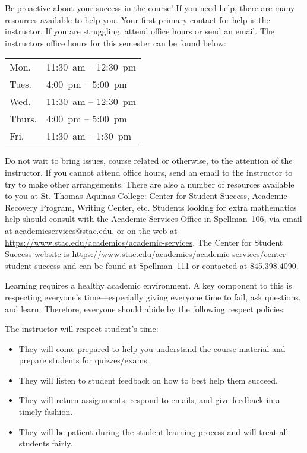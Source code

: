 \documentclass[11pt,letterpaper]{article}
\begin{document}
Be proactive about your success in the course! If you need help, there are many resources available to help you. Your first primary contact for help is the instructor. If you are struggling, attend office hours or send an email. The instructors office hours for this semester can be found below: \par
	\begin{table}[!ht]
	\centering
	\begin{tabular}{l || l}
	Mon. & 11:30~am -- 12:30~pm \\
	Tues. & 4:00~pm -- 5:00~pm \\
	Wed. & 11:30~am -- 12:30~pm \\
	Thurs. & 4:00~pm -- 5:00~pm \\
	Fri. & 11:30~am -- 1:30~pm
	\end{tabular}
	\end{table}
Do not wait to bring issues, course related or otherwise, to the attention of the instructor. If you cannot attend office hours, send an email to the instructor to try to make other arrangements. There are also a number of resources available to you at St. Thomas Aquinas College: Center for Student Success, Academic Recovery Program, Writing Center, etc. Students looking for extra mathematics help should consult with the Academic Services Office in Spellman~106, via email at \href{mailto:AcademicServices@stac.edu}{academicservices@stac.edu}, or on the web at \href{https://www.stac.edu/academics/academic-services}{https://www.stac.edu/academics/academic-services}. The Center for Student Success website is \url{https://www.stac.edu/academics/academic-services/center-student-success} and can be found at Spellman~111 or contacted at 845.398.4090. \sectionbreak





\newpage





Learning requires a healthy academic environment. A key component to this is respecting everyone's time---especially giving everyone time to fail, ask questions, and learn. Therefore, everyone should abide by the following respect policies: 

The instructor will respect student's time:
	\begin{itemize}
	\item They will come prepared to help you understand the course material and prepare students for quizzes/exams. 
	\item They will listen to student feedback on how to best help them succeed. 
	\item They will return assignments, respond to emails, and give feedback in a timely fashion. 
	\item They will be patient during the student learning process and will treat all students fairly. 
	\end{itemize} \pspace
\end{document}
